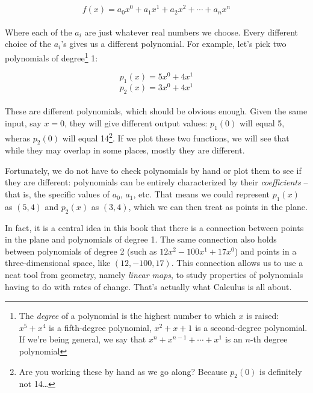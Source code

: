 \[f(x) = a_0 x^0 + a_1 x^1 + a_2 x^2 + \cdots + a_n x^n\]\\

Where each of the $a_i$ are just whatever real numbers we choose. Every different choice of the $a_i$'s gives us a different polynomial. For example, let's pick two polynomials of degree\footnote{The \emph{degree} of a polynomial is the highest number to which $x$ is raised: $x^5 + x^4$ is a fifth-degree polynomial, $x^2 + x + 1$ is a second-degree polynomial. If we're being general, we say that $x^n + x^{n-1} + \cdots + x^1$ is an $n$-th degree polynomial} 1: 

\[p_1(x) = 5 x^0 + 4 x^1\]
\[p_2(x) = 3 x^0 + 4 x^1\]\\

These are different polynomials, which should be obvious enough. Given the same input, say $x=0$, they will give different output values: $p_1(0)$ will equal 5, wheras $p_2(0)$ will equal 14\footnote{Are you working these by hand as we go along? Because $p_2(0)$ is definitely not 14\ldots}. If we plot these two functions, we will see that while they may overlap in some places, mostly they are different. 

Fortunately, we do not have to check polynomials by hand or plot them to see if they are different: polynomials can be entirely characterized by their \emph{coefficients} -- that is, the specific values of $a_0$, $a_1$, etc. That means we could represent $p_1(x)$ as $(5,4)$ and $p_2(x)$ as $(3,4)$, which we can then treat as points in the plane.

In fact, it is a central idea in this book that there is a connection between points in the plane and polynomials of degree 1. The same connection also holds between polynomials of degree 2 (such as $12x^2 - 100x^1 + 17x^0$) and points in a three-dimensional space, like $(12,-100,17)$. This connection allows us to use a neat tool from geometry, namely \emph{linear maps}, to study properties of polynomials having to do with rates of change. That's actually what Calculus is all about.
